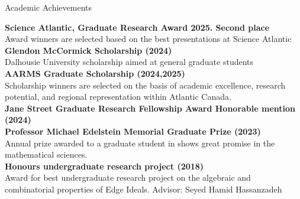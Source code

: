 \documentclass[12pt]{resume} %
\begin{document}
\begin{rSection}{Academic Achievements}

{\bf Science Atlantic, Graduate Research Award 2025. Second place}
\\
Award winners are selected based on the best presentations at Science Atlantic
\\[1mm]
{\bf Glendon McCormick Scholarship (2024)}
\\
Dalhousie University scholarship aimed at general graduate students
\\[1mm]
{\bf AARMS Graduate Scholarship (2024,2025)}
\\
Scholarship winners are selected on the basis of academic excellence, research potential, and regional representation within Atlantic Canada.
\\[1mm]
{\bf Jane Street Graduate Research Fellowship Award Honorable mention (2024)}
\\[1mm]
{\bf Professor Michael Edelstein Memorial Graduate Prize (2023)}
\\
Annual prize awarded to a graduate student in shows great promise in the mathematical sciences. 
\\[1mm]
{\bf Honours undergraduate research project (2018)}
\\
Award for best undergraduate research project on the algebraic and combinatorial properties of Edge Ideals.
Advisor: Seyed Hamid Hassanzadeh
\end{rSection}





    
\end{document}
